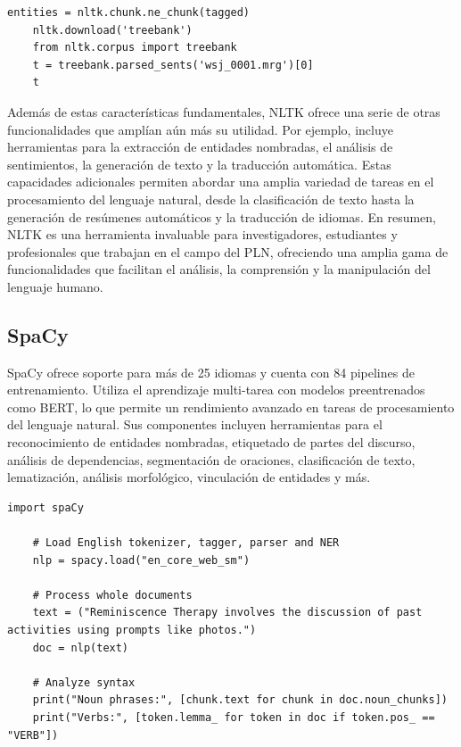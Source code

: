 \begin{lstlisting}[style=SpyderStyle, caption={Análisis sintáctico y lematización con nltk}, captionpos=b, label={lst:python},breaklines = true]
	entities = nltk.chunk.ne_chunk(tagged)
	nltk.download('treebank')
	from nltk.corpus import treebank
	t = treebank.parsed_sents('wsj_0001.mrg')[0]
	t
\end{lstlisting}


Además de estas características fundamentales, NLTK ofrece una serie de otras funcionalidades que amplían aún más su utilidad. Por ejemplo, incluye herramientas para la extracción de entidades nombradas, el análisis de sentimientos, la generación de texto y la traducción automática. Estas capacidades adicionales permiten abordar una amplia variedad de tareas en el procesamiento del lenguaje natural, desde la clasificación de texto hasta la generación de resúmenes automáticos y la traducción de idiomas. En resumen, NLTK es una herramienta invaluable para investigadores, estudiantes y profesionales que trabajan en el campo del PLN, ofreciendo una amplia gama de funcionalidades que facilitan el análisis, la comprensión y la manipulación del lenguaje humano.


\subsection{SpaCy}


SpaCy ofrece soporte para más de 25 idiomas y cuenta con 84 pipelines de entrenamiento. Utiliza el aprendizaje multi-tarea con modelos preentrenados como BERT, lo que permite un rendimiento avanzado en tareas de procesamiento del lenguaje natural. Sus componentes incluyen herramientas para el reconocimiento de entidades nombradas, etiquetado de partes del discurso, análisis de dependencias, segmentación de oraciones, clasificación de texto, lematización, análisis morfológico, vinculación de entidades y más.

\begin{lstlisting}[style=SpyderStyle, caption={Ejemplo de tokenización usando spaCy}, captionpos=b, label={lst:python},breaklines = true]
	import spaCy
	
	# Load English tokenizer, tagger, parser and NER
	nlp = spacy.load("en_core_web_sm")
	
	# Process whole documents
	text = ("Reminiscence Therapy involves the discussion of past activities using prompts like photos.")
	doc = nlp(text)
	
	# Analyze syntax
	print("Noun phrases:", [chunk.text for chunk in doc.noun_chunks])
	print("Verbs:", [token.lemma_ for token in doc if token.pos_ == "VERB"])
\end{lstlisting}

